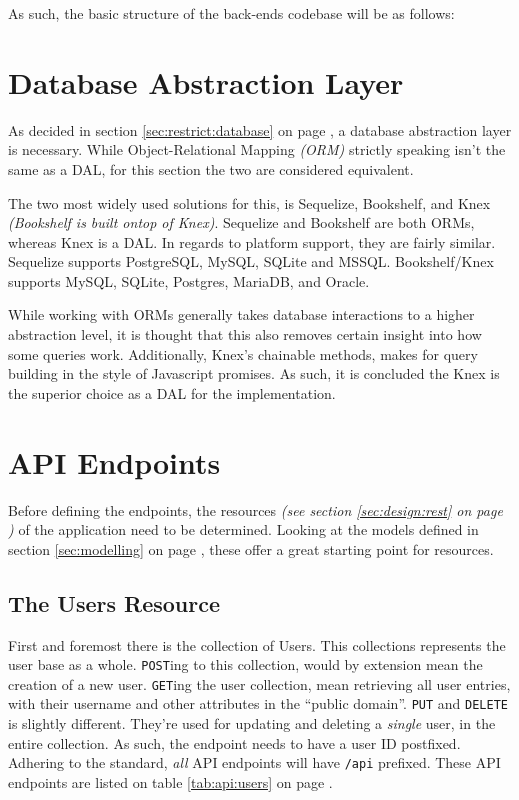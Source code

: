 		As such, the basic structure of the back-ends codebase will be as follows:
	\section{Database Abstraction Layer}
		As decided in section \ref{sec:restrict:database} on page \pageref{sec:restrict:database}, a database abstraction layer is necessary. While Object-Relational Mapping \emph{(ORM)} strictly speaking isn't the same as a DAL, for this section the two are considered equivalent.

		The two most widely used solutions for this, is Sequelize, Bookshelf, and Knex \emph{(Bookshelf is built ontop of Knex)}. Sequelize and Bookshelf are both ORMs, whereas Knex is a DAL. In regards to platform support, they are fairly similar. Sequelize supports PostgreSQL, MySQL, SQLite and MSSQL. Bookshelf/Knex supports MySQL, SQLite, Postgres, MariaDB, and Oracle.

		While working with ORMs generally takes database interactions to a higher abstraction level, it is thought that this also removes certain insight into how some queries work. Additionally, Knex's chainable methods, makes for query building in the style of Javascript promises. As such, it is concluded the Knex is the superior choice as a DAL for the implementation.

	\section{API Endpoints}
		\label{sec:impl:api}
		Before defining the endpoints, the resources \emph{(see section \ref{sec:design:rest} on page \pageref{sec:design:rest})} of the application need to be determined. Looking at the models defined in section \ref{sec:modelling} on page \pageref{sec:modelling}, these offer a great starting point for resources.

		\subsection{The Users Resource}
			First and foremost there is the collection of Users. This collections represents the user base as a whole. \verb=POST=ing to this collection, would by extension mean the creation of a new user. \verb=GET=ing the user collection, mean retrieving all user entries, with their username and other attributes in the ``public domain''. \verb=PUT= and \verb=DELETE= is slightly different. They're used for updating and deleting a \emph{single} user, in the entire collection. As such, the endpoint needs to have a user ID postfixed. Adhering to the standard, \emph{all} API endpoints will have \verb=/api= prefixed. These API endpoints are listed on table \ref{tab:api:users} on page \pageref{tab:api:users}.

